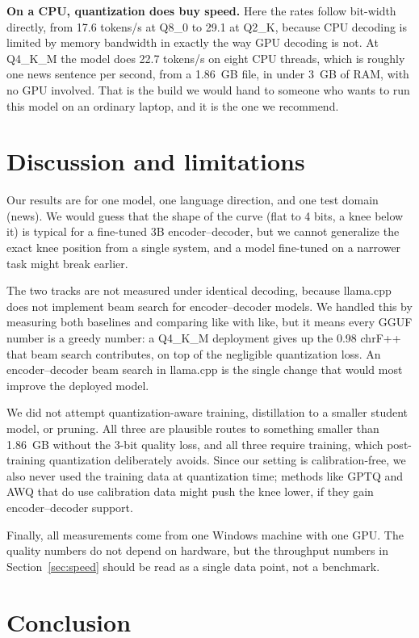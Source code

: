 \documentclass[10pt,twocolumn]{article}
\begin{document}
\textbf{On a CPU, quantization does buy speed.} Here the rates follow
bit-width directly, from 17.6 tokens/s at Q8\_0 to 29.1 at Q2\_K, because
CPU decoding is limited by memory bandwidth in exactly the way GPU
decoding is not. At Q4\_K\_M the model does 22.7 tokens/s on eight CPU
threads, which is roughly one news sentence per second, from a 1.86~GB
file, in under 3~GB of RAM, with no GPU involved. That is the build we
would hand to someone who wants to run this model on an ordinary laptop,
and it is the one we recommend.

\section{Discussion and limitations}

Our results are for one model, one language direction, and one test
domain (news). We would guess that the shape of the curve (flat to 4
bits, a knee below it) is typical for a fine-tuned 3B encoder--decoder,
but we cannot generalize the exact knee position from a single system,
and a model fine-tuned on a narrower task might break earlier.

The two tracks are not measured under identical decoding, because
llama.cpp does not implement beam search for encoder--decoder models. We
handled this by measuring both baselines and comparing like with like,
but it means every GGUF number is a greedy number: a Q4\_K\_M deployment
gives up the 0.98 chrF++ that beam search contributes, on top of the
negligible quantization loss. An encoder--decoder beam search in
llama.cpp is the single change that would most improve the deployed
model.

We did not attempt quantization-aware training, distillation to a smaller
student model, or pruning. All three are plausible routes to something
smaller than 1.86~GB without the 3-bit quality loss, and all three
require training, which post-training quantization deliberately avoids.
Since our setting is calibration-free, we also never used the training
data at quantization time; methods like GPTQ and AWQ that do use
calibration data might push the knee lower, if they gain
encoder--decoder support.

Finally, all measurements come from one Windows machine with one GPU.
The quality numbers do not depend on hardware, but the throughput numbers
in Section~\ref{sec:speed} should be read as a single data point, not a
benchmark.

\section{Conclusion}
\end{document}

